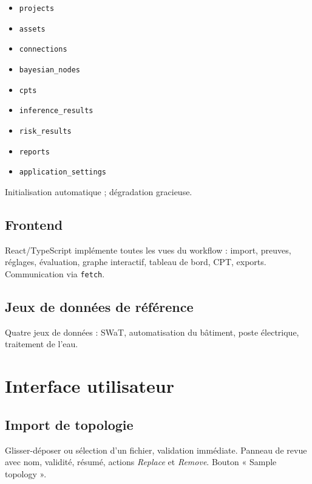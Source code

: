 \documentclass[12pt,a4paper]{article}
\newcommand{\forcereset}[1]{}
\begin{document}
\begin{itemize}[leftmargin=1.2cm, itemsep=0.2\baselineskip]
    \item \texttt{projects}
    \item \texttt{assets}
    \item \texttt{connections}
    \item \texttt{bayesian\_nodes}
    \item \texttt{cpts}
    \item \texttt{inference\_results}
    \item \texttt{risk\_results}
    \item \texttt{reports}
    \item \texttt{application\_settings}
\end{itemize}

Initialisation automatique ; dégradation gracieuse.

\subsection{Frontend}
\forcereset{4}

React/TypeScript implémente toutes les vues du workflow : import, preuves, réglages, évaluation, graphe interactif, tableau de bord, CPT, exports. Communication via \texttt{fetch}.

\subsection{Jeux de données de référence}
\forcereset{4}

Quatre jeux de données : SWaT, automatisation du bâtiment, poste électrique, traitement de l'eau.

\section{Interface utilisateur}
\forcereset{6}

\subsection{Import de topologie}
\forcereset{4}

Glisser-déposer ou sélection d'un fichier, validation immédiate. Panneau de revue avec nom, validité, résumé, actions \emph{Replace} et \emph{Remove}. Bouton « Sample topology ».
\end{document}
